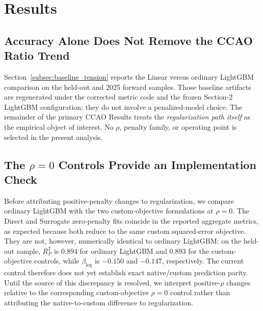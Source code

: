 \documentclass[10pt]{article}
\theoremstyle{definition}
\newcommand{\1}{\mathbf{1}}
\begin{document}
\section{Results}
\label{sec:results}


\subsection{Accuracy Alone Does Not Remove the CCAO Ratio Trend}
\label{subsec:ccao_baseline_results}

Section~\ref{subsec:baseline_tension} reports the Linear versus ordinary LightGBM
comparison on the held-out and 2025 forward samples. Those baseline artifacts are
regenerated under the corrected metric code and the frozen Section-2 LightGBM
configuration; they do not involve a penalized-model choice. The remainder of the
primary CCAO Results treats the \emph{regularization path itself} as the empirical
object of interest. No $\rho$, penalty family, or operating point is selected in the
present analysis.

\subsection{The $\rho=0$ Controls Provide an Implementation Check}
\label{subsec:zero_control_results}

Before attributing positive-penalty changes to regularization, we compare ordinary
LightGBM with the two custom-objective formulations at $\rho=0$. The Direct and
Surrogate zero-penalty fits coincide in the reported aggregate metrics, as expected
because both reduce to the same custom squared-error objective. They are not,
however, numerically identical to ordinary LightGBM: on the held-out sample,
$R^2_P$ is $0.894$ for ordinary LightGBM and $0.893$ for the custom-objective
controls, while $\beta_{\log}$ is $-0.150$ and $-0.147$, respectively. The current
control therefore does not yet establish exact native/custom prediction parity.
Until the source of this discrepancy is resolved, we interpret positive-$\rho$
changes relative to the corresponding custom-objective $\rho=0$ control rather
than attributing the native-to-custom difference to regularization.
\end{document}

